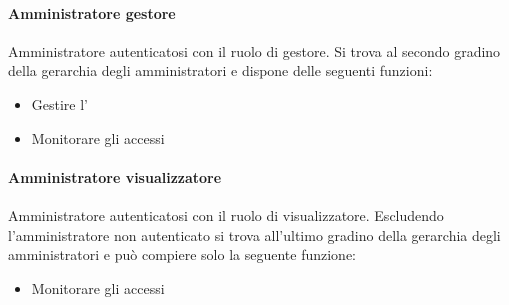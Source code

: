 \paragraph{Amministratore gestore}
Amministratore autenticatosi con il ruolo di gestore. 
Si trova al secondo gradino della gerarchia degli amministratori e dispone delle seguenti funzioni:
\begin{itemize}
\item Gestire l'
\item Monitorare gli accessi
\end{itemize}
\paragraph{Amministratore visualizzatore}
Amministratore autenticatosi con il ruolo di visualizzatore.
Escludendo l'amministratore non autenticato si trova all'ultimo gradino della gerarchia degli amministratori e può compiere solo la seguente funzione:
\begin{itemize}
\item Monitorare gli accessi
\end{itemize}




